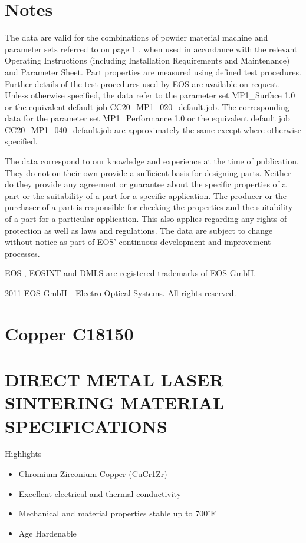 \documentclass[10pt]{article}
\begin{document}
\section*{Notes}
The data are valid for the combinations of powder material machine and parameter sets referred to on page 1 , when used in accordance with the relevant Operating Instructions (including Installation Requirements and Maintenance) and Parameter Sheet. Part properties are measured using defined test procedures. Further details of the test procedures used by EOS are available on request. Unless otherwise specified, the data refer to the parameter set MP1\_Surface 1.0 or the equivalent default job CC20\_MP1\_020\_default.job. The corresponding data for the parameter set MP1\_Performance 1.0 or the equivalent default job CC20\_MP1\_040\_default.job are approximately the same except where otherwise specified.

The data correspond to our knowledge and experience at the time of publication. They do not on their own provide a sufficient basis for designing parts. Neither do they provide any agreement or guarantee about the specific properties of a part or the suitability of a part for a specific application. The producer or the purchaser of a part is responsible for checking the properties and the suitability of a part for a particular application. This also applies regarding any rights of protection as well as laws and regulations. The data are subject to change without notice as part of EOS' continuous development and improvement processes.

EOS , EOSINT and DMLS are registered trademarks of EOS GmbH.

2011 EOS GmbH - Electro Optical Systems. All rights reserved.

\section*{Copper C18150}
\section*{DIRECT METAL LASER SINTERING MATERIAL SPECIFICATIONS}
Highlights

\begin{itemize}
  \item Chromium Zirconium Copper (CuCr1Zr)

  \item Excellent electrical and thermal conductivity

  \item Mechanical and material properties stable up to $700^{\circ} \mathrm{F}$

  \item Age Hardenable

\end{itemize}
\end{document}
